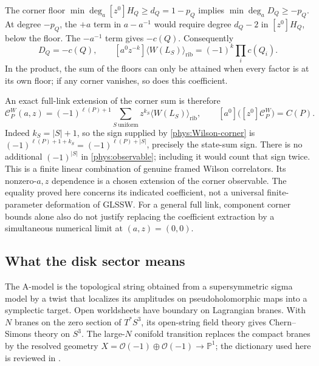 \documentclass[11pt,letterpaper]{article}
\numberwithin{equation}{section}
\theoremstyle{definition}
\theoremstyle{remark}
\begin{document}
The corner floor $\min\deg_a[z^0]H_Q\ge d_Q=1-p_Q$ implies
$\min\deg_a D_Q\ge-p_Q$. At degree $-p_Q$, the $+a$ term in
$a-a^{-1}$ would require degree $d_Q-2$ in $[z^0]H_Q$, below the floor.
The $-a^{-1}$ term gives $-c(Q)$. Consequently
\begin{equation}
 [a^{-p_Q}]D_Q=-c(Q),\qquad
 [a^0z^{-k}]\langle W(L_S)\rangle_{\mathrm{rib}}
 =(-1)^k\prod_i c(Q_i).
 \label{phys:Wilson-corner}
\end{equation}
In the product, the sum of the floors can only be attained when every
factor is at its own floor; if any corner vanishes, so does this
coefficient.

An exact full-link extension of the corner sum is therefore
\begin{equation}
 \boxed{\displaystyle
 \mathcal C_P^{W}(a,z)=(-1)^{\ell(P)+1}
   \sum_{S\ \mathrm{uniform}}z^{k_S}
       \langle W(L_S)\rangle_{\mathrm{rib}},\qquad
 [a^0]\bigl([z^0]\mathcal C_P^{W}\bigr)=C(P).}
 \label{phys:observable}
\end{equation}
Indeed $k_S=|S|+1$, so the sign supplied by
\eqref{phys:Wilson-corner} is
$(-1)^{\ell(P)+1+k_S}=(-1)^{\ell(P)+|S|}$, precisely the state-sum
sign. There is no additional $(-1)^{|S|}$ in
\eqref{phys:observable}; including it would count that sign twice.
This is a finite linear combination of genuine framed Wilson
correlators. Its nonzero-$a,z$ dependence is a chosen extension of the
corner observable. The equality proved here concerns its indicated
coefficient, not a universal finite-parameter deformation of GLSSW.
For a general full link, component corner bounds alone also do not
justify replacing the coefficient extraction by a simultaneous
numerical limit at $(a,z)=(0,0)$.

\subsection{What the disk sector means}

The A-model is the topological string obtained from a supersymmetric
sigma model by a twist that localizes its amplitudes on
pseudoholomorphic maps into a symplectic target. Open worldsheets have
boundary on Lagrangian branes. With $N$ branes on the zero section of
$T^*S^3$, its open-string field theory gives Chern--Simons theory on
$S^3$. The large-$N$ conifold transition replaces
the compact branes by the resolved geometry
$X=\mathcal O(-1)\oplus\mathcal O(-1)\to\mathbb P^1$; the dictionary
used here is reviewed in \cite[Sec.~2]{LMV}.
\end{document}
